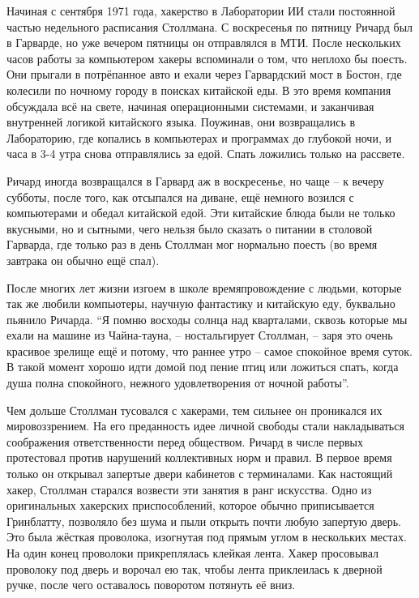 Начиная с сентября 1971 года, хакерство в Лаборатории ИИ стали постоянной частью недельного расписания Столлмана. С воскресенья по пятницу Ричард был в Гарварде, но уже вечером пятницы он отправлялся в МТИ. После нескольких часов работы за компьютером хакеры вспоминали о том, что неплохо бы поесть. Они прыгали в потрёпанное авто и ехали через Гарвардский мост в Бостон, где колесили по ночному городу в поисках китайской еды. В это время компания обсуждала всё на свете, начиная операционными системами, и заканчивая внутренней логикой китайского языка. Поужинав, они возвращались в Лабораторию, где копались в компьютерах и программах до глубокой ночи, и часа в 3-4 утра снова отправлялись за едой. Спать ложились только на рассвете.

Ричард иногда возвращался в Гарвард аж в воскресенье, но чаще -- к вечеру субботы, после того, как отсыпался на диване, ещё немного возился с компьютерами и обедал китайской едой. Эти китайские блюда были не только вкусными, но и сытными, чего нельзя было сказать о питании в столовой Гарварда, где только раз в день Столлман мог нормально поесть (во время завтрака он обычно ещё спал).

После многих лет жизни изгоем в школе времяпровождение с людьми, которые так же любили компьютеры, научную фантастику и китайскую еду, буквально пьянило Ричарда. \enquote{Я помню восходы солнца над кварталами, сквозь которые мы ехали на машине из Чайна-тауна, -- ностальгирует Столлман, -- заря это очень красивое зрелище ещё и потому, что раннее утро -- самое спокойное время суток. В такой момент хорошо идти домой под пение птиц или ложиться спать, когда душа полна спокойного, нежного удовлетворения от ночной работы}.

Чем дольше Столлман тусовался с хакерами, тем сильнее он проникался их мировоззрением. На его преданность идее личной свободы стали накладываться соображения ответственности перед обществом. Ричард в числе первых протестовал против нарушений коллективных норм и правил. В первое время только он открывал запертые двери кабинетов с терминалами. Как настоящий хакер, Столлман старался возвести эти занятия в ранг искусства. Одно из оригинальных хакерских приспособлений, которое обычно приписывается Гринблатту, позволяло без шума и пыли открыть почти любую запертую дверь. Это была жёсткая проволока, изогнутая под прямым углом в нескольких местах. На один конец проволоки прикреплялась клейкая лента. Хакер просовывал проволоку под дверь и ворочал ею так, чтобы лента приклеилась к дверной ручке, после чего оставалось поворотом потянуть её вниз.

